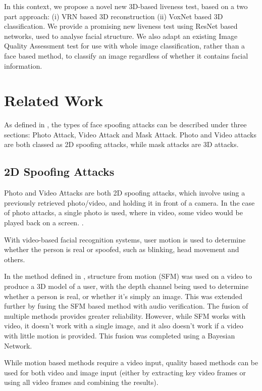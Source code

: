 \documentclass[10pt,a4paper]{article}
\begin{document}
    In this context, we propose a novel new 3D-based liveness test, based on a two part approach: (i) VRN based 3D reconstruction (ii) VoxNet based 3D classification.
    We provide a promising new liveness test using ResNet based networks, used to analyse facial structure. We also adapt an existing Image Quality Assessment test for use with whole image classification, rather
    than a face based method, to classify an image regardless of whether it contains facial information.

\section{Related Work}
    As defined in \cite{FaceSpoofingAttacksStudy}, the types of face spoofing attacks can be described under three sections: Photo Attack, Video Attack and Mask Attack.
    Photo and Video attacks are both classed as 2D spoofing attacks, while mask attacks are 3D attacks.

    \subsection{2D Spoofing Attacks}
        Photo and Video Attacks are both 2D spoofing attacks, which involve using a previously retrieved photo/video, and holding it in front of a camera. In the case of photo attacks,
        a single photo is used, where in video, some video would be played back on a screen. \cite{FaceSpoofingAttacksStudy}.

        With video-based facial recognition systems, user motion is used to determine whether the person is real or spoofed, such as blinking, head movement and others.

        In the method defined in \cite{SFMClassifier}, structure from motion (SFM) was used on a video to produce a 3D model of a user, with the depth channel being used to determine whether a person is real, or whether it's simply an image.
        This was extended further by fusing the SFM based method with audio verification. The fusion of multiple methods provides greater reliability. However, while SFM works with video, it doesn't work with a single image,
        and it also doesn't work if a video with little motion is provided. This fusion was completed using a Bayesian Network.

        While motion based methods require a video input, quality based methods can be used for both video and image input (either by extracting key video frames or using all video frames and combining the results).
\end{document}
